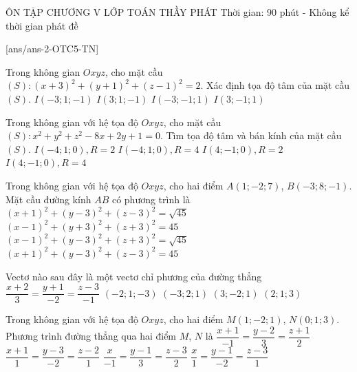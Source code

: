 \begin{name}
	{\tenchude}
	{ÔN TẬP CHƯƠNG V}
	{LỚP TOÁN THẦY PHÁT}
	{Thời gian: 90 phút - Không kể thời gian phát đề}
\end{name}
[ans/ans-2-OTC5-TN]
\caulc
\begin{ex}%
	Trong không gian $Oxyz$, cho mặt cầu $(S)\colon (x+3)^2+(y+1)^2+(z-1)^2=2$. Xác định tọa độ tâm của mặt cầu $(S)$.
	\choice
	{$I(-3; 1;-1)$}
	{$I(3; 1;-1)$}
	{\True $I(-3;-1; 1)$}
	{$I(3;-1; 1)$}
\end{ex}
\begin{ex}%
	Trong không gian với hệ tọa độ $Oxyz$, cho mặt cầu $(S)\colon x^2+y^2+z^2-8x+2y+1=0$. Tìm tọa độ tâm và bán kính của mặt cầu $(S)$.
	\choice
	{$I(-4; 1; 0), R=2$}
	{$I(-4; 1; 0), R=4$}
	{$I(4;-1; 0), R=2$}
	{\True $I(4;-1; 0), R=4$}
\end{ex}
\begin{ex}%
	Trong không gian với hệ tọa độ $Oxyz$, cho hai điểm $A(1;-2; 7)$, $B(-3; 8;-1)$. Mặt cầu đường kính $AB$ có phương trình là
	\choice
	{$(x+1)^2+(y-3)^2+(z-3)^2=\sqrt{45}$}
	{$(x-1)^2+(y+3)^2+(z+3)^2=45$}
	{$(x-1)^2+(y-3)^2+(z+3)^2=\sqrt{45}$}
	{\True $(x+1)^2+(y-3)^2+(z-3)^2=45$}
\end{ex}
\begin{ex}%
	Vectơ nào sau đây là một vectơ chỉ phương của đường thẳng $\dfrac{x+2}{3}=\dfrac{y+1}{-2}=\dfrac{z-3}{-1}$ 
	\choice
	{$(-2; 1;-3)$}
	{\True $(-3; 2; 1)$}
	{$(3;-2; 1)$}
	{$(2; 1; 3)$}
\end{ex}
\begin{ex}%
	Trong không gian với hệ tọa độ $Oxyz$, cho hai điểm $M(1;-2; 1)$, $N(0; 1; 3)$. Phương trình đường thẳng qua hai điểm $M$, $N$ là
	\choice
	{$\dfrac{x+1}{-1}=\dfrac{y-2}{3}=\dfrac{z+1}{2}$}
	{$\dfrac{x+1}{1}=\dfrac{y-3}{-2}=\dfrac{z-2}{1}$}
	{\True $\dfrac{x}{-1}=\dfrac{y-1}{3}=\dfrac{z-3}{2}$}
	{$\dfrac{x}{1}=\dfrac{y-1}{-2}=\dfrac{z-3}{1}$}
\end{ex}
